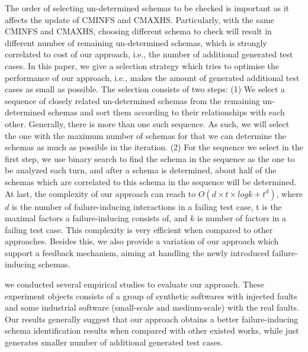 \documentclass[10pt,journal,cspaper,compsoc]{IEEEtran}
\begin{document}
The order of selecting un-determined schemas to be checked is important as it affects the update of CMINFS and CMAXHS. Particularly, with the same CMINFS and CMAXHS, choosing different schema to check will result in different number of remaining un-determined schemas, which is strongly correlated to cost of our approach, i.e., the number of additional generated test cases. In this paper, we give a selection strategy which tries to optimise the performance of our approach, i.e., makes the amount of generated additional test cases as small as possible. The selection consists of two steps: (1) We select a sequence of closely related un-determined schemas from the remaining un-determined schemas and sort them according to their relationships with each other. Generally, there is more than one such sequence. As such, we will select the one with the maximum number of schemas for that we can determine the schemas as much as possible in the iteration. (2) For the sequence we select in the first step, we use binary search to find the schema in the sequence as the one to be analyzed each turn, and after a schema is determined, about half of the schemas which are correlated to this schema in the sequence will be determined. At last, the complexity of our approach can reach to $O(d\times t \times log k + t^{d})$, where $d$ is the number of failure-inducing interactions in a failing test case, t is the maximal factors a failure-inducing consists of, and $k$ is number of factors in a failing test case. This complexity is very efficient when compared to other approaches. Besides this, we also provide a variation of our approach which support a feedback mechanism, aiming at handling the newly introduced failure-inducing schemas.

%

we conducted several empirical studies to evaluate our approach. These experiment objects consists of a group of synthetic softwares with injected faults and some industrial software (small-scale and medium-scale) with the real faults. Our results generally suggest that our approach obtains a better failure-inducing schema identification results when compared with other existed works, while just generates smaller number of additional generated test cases.
\end{document}
